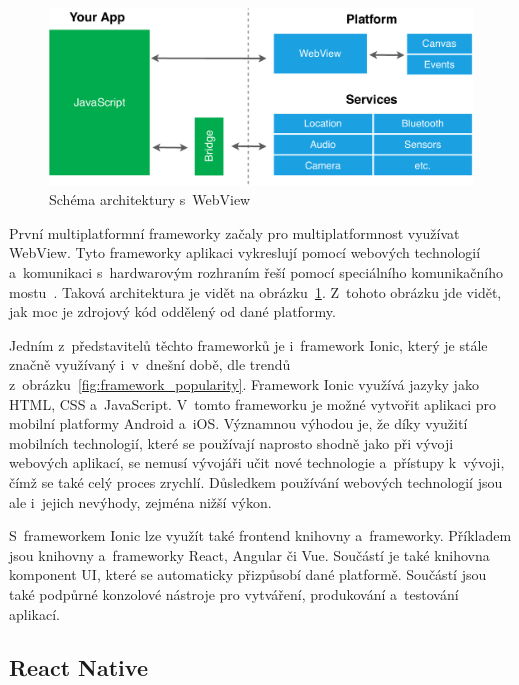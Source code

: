 \begin{figure}
    \centering
    \includegraphics[width=\linewidth]{assets/technology-research/framework/webview.pdf}
    \caption{Schéma architektury s~WebView~\cite{hackernoon_flutter}}
    \label{fig:framework_webview}
\end{figure}

První multiplatformní frameworky začaly pro multiplatformnost využívat
WebView.
Tyto frameworky aplikaci vykreslují pomocí webových technologií
a~komunikaci s~hardwarovým rozhraním řeší pomocí speciálního komunikačního
mostu~\cite{hackernoon_flutter}.
Taková architektura je vidět na obrázku~\ref{fig:framework_webview}.
Z~tohoto obrázku jde vidět,
jak moc je zdrojový kód oddělený od dané platformy.

Jedním z~představitelů těchto frameworků je i~framework Ionic,
který je stále značně využívaný i~v~dnešní době,
dle trendů z~obrázku~\ref{fig:framework_popularity}.
Framework Ionic využívá jazyky jako HTML, CSS a~JavaScript.
V~tomto frameworku je možné vytvořit aplikaci pro mobilní platformy
Android a~iOS.
Významnou výhodou je,
že díky využití mobilních technologií,
které se používají naprosto shodně jako při vývoji webových aplikací,
se nemusí vývojáři učit nové technologie a~přístupy k~vývoji,
čímž se také celý proces zrychlí.
Důsledkem používání webových technologií jsou ale i~jejich nevýhody,
zejména nižší výkon.~\cite{dashmagazine_mobile_frameworks}

S~frameworkem Ionic lze využít také frontend knihovny a~frameworky.
Příkladem jsou knihovny a~frameworky React, Angular či Vue.
Součástí je také knihovna komponent UI,
které se automaticky přizpůsobí dané platformě.
Součástí jsou také podpůrné konzolové nástroje pro vytváření, produkování
a~testování aplikací.~\cite{ionic}

\subsection{React Native}

